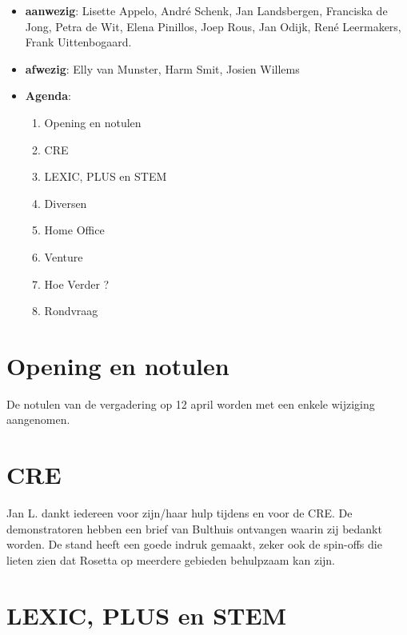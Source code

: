 
   \RosSupersedes{-}
   \MakeRosTitle



\begin{itemize}
  \item {\bf aanwezig}: Lisette Appelo, Andr\'{e} Schenk, Jan Landsbergen, 
                     Franciska de Jong, Petra de Wit,  
                     Elena Pinillos, Joep Rous, Jan Odijk,
                     Ren\'{e} Leermakers, Frank Uittenbogaard.

  \item {\bf afwezig}: Elly van Munster, Harm Smit, Josien Willems
  \item {\bf Agenda}:
    \begin{enumerate}
       \item Opening en notulen
       \item CRE
       \item LEXIC, PLUS en STEM
       \item Diversen
       \item Home Office
       \item Venture
       \item Hoe Verder ?
       \item Rondvraag
    \end{enumerate}
\end{itemize}

\section {Opening en notulen}
De notulen van de vergadering op 12 april worden met een enkele wijziging 
aangenomen.

\section {CRE}
Jan L. dankt iedereen voor zijn/haar hulp tijdens en voor de CRE. De 
demonstratoren hebben een brief van Bulthuis ontvangen waarin zij
bedankt worden. De stand heeft een goede indruk gemaakt, zeker ook de spin-offs 
die lieten zien dat Rosetta op meerdere gebieden behulpzaam kan zijn.

\section {LEXIC, PLUS en STEM}

